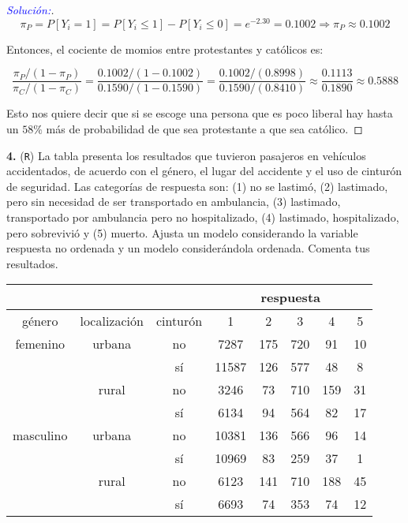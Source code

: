 \documentclass[12pt,a4paper,oneside]{article}
\begin{document}
\begin{compactenum}
\begin{proof}[\textcolor{blue}{Solución:}]
$$\pi_P = P[Y_i = 1] = P[Y_i \leq 1] - P[Y_i \leq 0] = e^{-2.30} = 0.1002 \Rightarrow \pi_P \approx 0.1002$$

Entonces, el cociente de momios entre protestantes y católicos es:

$$\frac{\pi_P/ (1 - \pi_P)}{\pi_C / (1 - \pi_C)} = \frac{0.1002 / (1-0.1002)}{0.1590 / (1 - 0.1590)} = \frac{0.1002 / (0.8998)}{0.1590 / (0.8410)} \approx \frac{0.1113}{0.1890} \approx 0.5888$$

Esto nos quiere decir que si se escoge una persona que es poco liberal hay hasta un $58\%$ más de probabilidad de que sea protestante a que sea católico.  

\end{proof}

\end{compactenum}

\noindent \textbf{4. } (\texttt{R}) 	La tabla presenta los resultados que tuvieron pasajeros en vehículos accidentados, de acuerdo con el género, el lugar del accidente y el uso de cinturón de seguridad.  Las categorías de respuesta son: (1) no se lastimó, (2) lastimado, pero sin necesidad de ser transportado en ambulancia, (3) lastimado, transportado por ambulancia pero no hospitalizado, (4) lastimado, hospitalizado, pero sobrevivió y (5) muerto.  Ajusta un modelo considerando la variable respuesta no ordenada y un modelo considerándola ordenada.  Comenta tus resultados.

\begin{table}[htpb]
	\centering 
	\begin{tabular}{ccc|ccccc}
		& & & \multicolumn{5}{c}{respuesta}\\
		\hline
género	 &localización&	cinturón&	1&	2	&3&	4&	5\\
\hline
femenino &	urbana&	no&	7287&	175&	720&	91	&10\\
&&sí&	11587	&126&	577&	48&	8\\
&rural	&no&	3246&	73	&710&	159&	31\\
&&sí	&6134&	94&	564&	82&	17\\
masculino &	urbana	&no&	10381&	136&	566&	96&	14\\
&&sí&	10969&	83&	259&	37	&1\\
&rural	&no&	6123	&141&	710	&188&	45\\
& &sí&	6693&	74	&353&	74&	12\\
\hline
\end{tabular}
\end{table}
\end{document}
